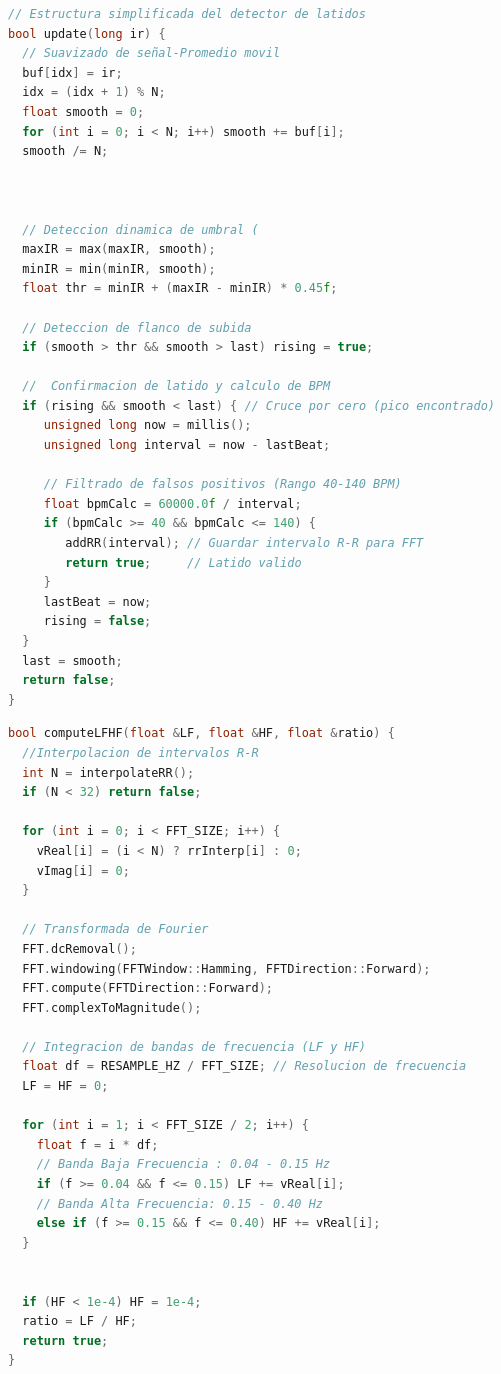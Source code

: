 \begin{lstlisting}[language=C++, caption={Algoritmo de detección de picos y cálculo de BPM}, label={code:detector_latidos}]
// Estructura simplificada del detector de latidos
bool update(long ir) {
  // Suavizado de señal-Promedio movil
  buf[idx] = ir;
  idx = (idx + 1) % N;
  float smooth = 0;
  for (int i = 0; i < N; i++) smooth += buf[i];
  smooth /= N;



  // Deteccion dinamica de umbral (
  maxIR = max(maxIR, smooth);
  minIR = min(minIR, smooth);
  float thr = minIR + (maxIR - minIR) * 0.45f; 

  // Deteccion de flanco de subida
  if (smooth > thr && smooth > last) rising = true;

  //  Confirmacion de latido y calculo de BPM
  if (rising && smooth < last) { // Cruce por cero (pico encontrado)
     unsigned long now = millis();
     unsigned long interval = now - lastBeat;
     
     // Filtrado de falsos positivos (Rango 40-140 BPM)
     float bpmCalc = 60000.0f / interval;
     if (bpmCalc >= 40 && bpmCalc <= 140) {
        addRR(interval); // Guardar intervalo R-R para FFT
        return true;     // Latido valido
     }
     lastBeat = now;
     rising = false;
  }
  last = smooth;
  return false;
}
\end{lstlisting}

\begin{lstlisting}[language=C++, caption={Cálculo de la relación LF/HF mediante FFT}, label={code:fft_process}]
bool computeLFHF(float &LF, float &HF, float &ratio) {
  //Interpolacion de intervalos R-R 
  int N = interpolateRR(); 
  if (N < 32) return false; 

  for (int i = 0; i < FFT_SIZE; i++) {
    vReal[i] = (i < N) ? rrInterp[i] : 0;
    vImag[i] = 0;
  }

  // Transformada de Fourier
  FFT.dcRemoval(); 
  FFT.windowing(FFTWindow::Hamming, FFTDirection::Forward);
  FFT.compute(FFTDirection::Forward);
  FFT.complexToMagnitude();

  // Integracion de bandas de frecuencia (LF y HF)
  float df = RESAMPLE_HZ / FFT_SIZE; // Resolucion de frecuencia
  LF = HF = 0;

  for (int i = 1; i < FFT_SIZE / 2; i++) {
    float f = i * df;
    // Banda Baja Frecuencia : 0.04 - 0.15 Hz
    if (f >= 0.04 && f <= 0.15) LF += vReal[i];
    // Banda Alta Frecuencia: 0.15 - 0.40 Hz
    else if (f >= 0.15 && f <= 0.40) HF += vReal[i];
  }

 
  if (HF < 1e-4) HF = 1e-4; 
  ratio = LF / HF;
  return true;
}
\end{lstlisting}